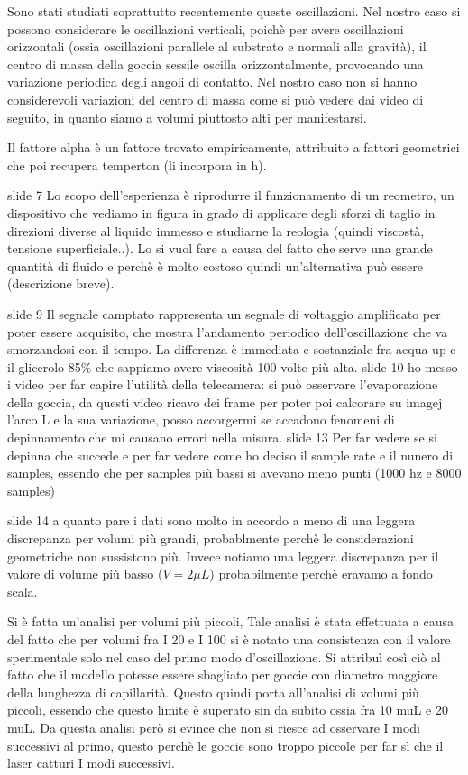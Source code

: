 \documentclass[letterpaper,12pt]{article}
\begin{document}
Sono stati studiati soprattutto recentemente queste oscillazioni. Nel nostro caso si possono considerare le oscillazioni verticali, poichè per avere oscillazioni orizzontali (ossia oscillazioni parallele al substrato e normali alla gravità), il centro di massa della goccia sessile oscilla orizzontalmente, provocando una variazione periodica degli angoli di contatto. Nel nostro caso non si hanno considerevoli variazioni del centro di massa come si può vedere dai video di seguito, in quanto siamo a volumi piuttosto alti per manifestarsi.

Il fattore alpha è un fattore trovato empiricamente, attribuito a fattori geometrici che poi recupera temperton (li incorpora in h).

slide 7
Lo scopo dell'esperienza è riprodurre il funzionamento di un reometro, un dispositivo che vediamo in figura in grado di applicare degli sforzi di taglio in direzioni diverse al liquido immesso e studiarne la reologia (quindi viscostà, tensione superficiale..). Lo si vuol fare a causa del fatto che serve una grande quantità di fluido e perchè è molto costoso quindi un'alternativa può essere (descrizione breve).
 
 
slide 9
Il segnale camptato rappresenta un segnale di voltaggio amplificato per poter essere acquisito, che mostra l'andamento periodico dell'oscillazione che va smorzandosi con il tempo. La differenza è immediata e sostanziale fra acqua up e il glicerolo 85\% che sappiamo avere viscosità 100 volte più alta.
slide 10
ho messo i video per far capire l'utilità della telecamera: si può osservare l'evaporazione della goccia, da questi video ricavo dei frame per poter poi calcorare su imagej l'arco L e la sua variazione, posso accorgermi se accadono fenomeni di depinnamento che mi causano errori nella misura.
slide 13
Per far vedere se si depinna che succede e per far vedere come ho deciso il sample rate e il nunero di samples, essendo che per samples più bassi si avevano meno punti (1000 hz e 8000 samples)

slide 14
a quanto pare i dati sono molto in accordo a meno di una leggera discrepanza per volumi più grandi, probablmente perchè le considerazioni geometriche non sussistono più. Invece notiamo una leggera discrepanza per il valore di volume più basso ($V=2 \mu L$) probabilmente perchè eravamo a fondo scala.

Si è fatta un'analisi per volumi più piccoli, Tale analisi è stata effettuata a causa del fatto che per volumi
 fra I 20 e I 100 si è notato una consistenza con il valore sperimentale
solo nel caso del primo modo d'oscillazione. Si attribuì così ciò 
al fatto che il modello potesse essere sbagliato per goccie con 
diametro maggiore della lunghezza di capillarità. Questo quindi porta all'analisi
di volumi più piccoli, essendo che questo limite è superato sin da subito
ossia fra 10 muL e 20 muL.
Da questa analisi però si evince che non si riesce ad osservare I modi successivi al primo, questo perchè le goccie sono troppo piccole per far sì che il laser catturi I modi successivi.
\end{document}
